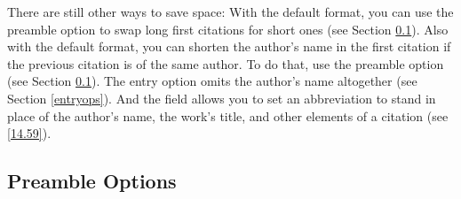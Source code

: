 \documentclass[11pt,letterpaper,oneside]{article}
\begin{document}
\begin{citeonly}
\item \cite[3]{morrison2004a}
\item \cite[18]{morrison2004a}
\item \cite[18]{morrison2004a}
\item \cite[24--26]{morrison2004a}
\item \cite[401-2]{morrison2004b}
\item \cite[433]{morrison2004b}
\item \cite[37--38]{diaz2008}
\item \cite[403]{morrison2004b}
\item \cite[152]{diaz2008}
\item \cite[201-2]{diaz2008}
\item \cites[240]{morrison2004b}[32]{morrison2004a}
\item \cite[33]{morrison2004a}
\end{citeonly}

There are still other ways to save space: With the default format, you
can use the preamble option  to swap long first
citations for short ones (see Section \ref{preops}). Also with the
default format, you can shorten the author's name in the first
citation if the previous citation is of the same author. To do that,
use the preamble option  (see Section \ref{preops}).
The entry option  omits the author's name altogether (see
Section \ref{entryops}). And the  field allows you
to set an abbreviation to stand in place of the author's name, the
work's title, and other elements of a citation (see \ref{14.59}).

\subsection{Preamble Options}
\label{preops}
\end{document}
